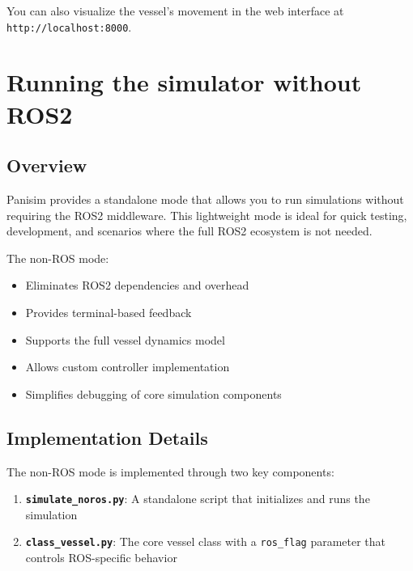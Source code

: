 \documentclass[
  letterpaper,
  DIV=11,
  numbers=noendperiod]{scrreprt}
\providecommand{\tightlist}{%
  \setlength{\itemsep}{0pt}\setlength{\parskip}{0pt}}\usepackage{longtable,booktabs,array}
\begin{document}
You can also visualize the vessel's movement in the web interface at
\texttt{http://localhost:8000}.


\chapter*{Running the simulator without
ROS2}\label{running-the-simulator-without-ros2}


\section*{Overview}\label{overview-9}


Panisim provides a standalone mode that allows you to run simulations
without requiring the ROS2 middleware. This lightweight mode is ideal
for quick testing, development, and scenarios where the full ROS2
ecosystem is not needed.

The non-ROS mode:

\begin{itemize}
\tightlist
\item
  Eliminates ROS2 dependencies and overhead
\item
  Provides terminal-based feedback
\item
  Supports the full vessel dynamics model
\item
  Allows custom controller implementation
\item
  Simplifies debugging of core simulation components
\end{itemize}

\section*{Implementation Details}\label{implementation-details-1}


The non-ROS mode is implemented through two key components:

\begin{enumerate}
\def\labelenumi{\arabic{enumi}.}
\tightlist
\item
  \textbf{\texttt{simulate\_noros.py}}: A standalone script that
  initializes and runs the simulation
\item
  \textbf{\texttt{class\_vessel.py}}: The core vessel class with a
  \texttt{ros\_flag} parameter that controls ROS-specific behavior
\end{enumerate}
\end{document}
